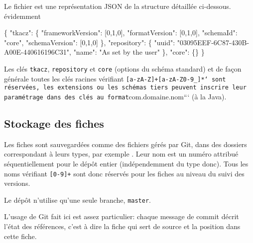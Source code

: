 \documentclass[11pt]{article}
\newenvironment{Shaded}{}{}
\newcommand{\DataTypeTok}[1]{\textcolor[rgb]{0.56,0.13,0.00}{{#1}}}
\newcommand{\DecValTok}[1]{\textcolor[rgb]{0.25,0.63,0.44}{{#1}}}
\newcommand{\StringTok}[1]{\textcolor[rgb]{0.25,0.44,0.63}{{#1}}}
\newcommand{\NormalTok}[1]{{#1}}
\begin{document}
Le fichier  est une représentation JSON de
la structure détaillée ci-dessous. évidemment

\begin{Shaded}
\begin{Highlighting}[]
\NormalTok{\{}
    \DataTypeTok{"tkacz"}\NormalTok{: \{}
        \DataTypeTok{"frameworkVersion"}\NormalTok{: [}\DecValTok{0}\NormalTok{,}\DecValTok{1}\NormalTok{,}\DecValTok{0}\NormalTok{],}
        \DataTypeTok{"formatVersion"}\NormalTok{:    [}\DecValTok{0}\NormalTok{,}\DecValTok{1}\NormalTok{,}\DecValTok{0}\NormalTok{],}
        \DataTypeTok{"schemaId"}\NormalTok{:         }\StringTok{"core"}\NormalTok{,}
        \DataTypeTok{"schemaVersion"}\NormalTok{:    [}\DecValTok{0}\NormalTok{,}\DecValTok{1}\NormalTok{,}\DecValTok{0}\NormalTok{]}
    \NormalTok{\},}
    \DataTypeTok{"repository"}\NormalTok{: \{}
        \DataTypeTok{"uuid"}\NormalTok{:             }\StringTok{"03095EEF-6C87-430B-A00E-440616196C31"}\NormalTok{,}
        \DataTypeTok{"name"}\NormalTok{:             }\StringTok{"As set by the user"}
    \NormalTok{\},}
    \DataTypeTok{"core"}\NormalTok{: \{\}}
\NormalTok{\}}
\end{Highlighting}
\end{Shaded}

Les clés \texttt{tkacz}, \texttt{repository} et \texttt{core} (options
du schéma standard) et de façon générale toutes les clés racines
vérifiant
\texttt{{[}a-zA-Z{]}+{[}a-zA-Z0-9\_{]}*` sont réservées, les extensions ou les schémas tiers peuvent inscrire leur paramétrage dans des clés au format}com.domaine.nom```
(à la Java).

\subsection{Stockage des fiches}\label{stockage-des-fiches}

Les fiches sont sauvegardées comme des fichiers gérés par Git, dans des
dossiers correspondant à leurs types, par exemple
. Leur nom est un numéro attribué
séquentiellement pour le dépôt entier (indépendemment du type donc).
Tous les noms vérifiant \texttt{{[}0-9{]}+} sont donc réservés pour les
fiches au niveau du suivi des versions.

Le dépôt n'utilise qu'une seule branche, \texttt{master}.

L'usage de Git fait ici est assez particulier: chaque message de commit
décrit l'état des références, c'est à dire la fiche qui sert de source
et la position dans cette fiche.
\end{document}
